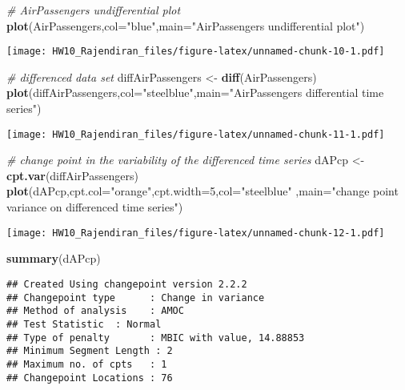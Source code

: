 \documentclass[]{article}
\newenvironment{Shaded}{\begin{snugshade}}{\end{snugshade}}
\newcommand{\CommentTok}[1]{\textcolor[rgb]{0.56,0.35,0.01}{\textit{#1}}}
\newcommand{\DataTypeTok}[1]{\textcolor[rgb]{0.13,0.29,0.53}{#1}}
\newcommand{\DecValTok}[1]{\textcolor[rgb]{0.00,0.00,0.81}{#1}}
\newcommand{\KeywordTok}[1]{\textcolor[rgb]{0.13,0.29,0.53}{\textbf{#1}}}
\newcommand{\NormalTok}[1]{#1}
\newcommand{\StringTok}[1]{\textcolor[rgb]{0.31,0.60,0.02}{#1}}
\begin{document}
\begin{Shaded}
\begin{Highlighting}[]
\CommentTok{# AirPassengers undifferential plot}
\KeywordTok{plot}\NormalTok{(AirPassengers,}\DataTypeTok{col=}\StringTok{"blue"}\NormalTok{,}\DataTypeTok{main=}\StringTok{"AirPassengers undifferential plot"}\NormalTok{)}
\end{Highlighting}
\end{Shaded}

\texttt{[image: HW10\_Rajendiran\_files/figure-latex/unnamed-chunk-10-1.pdf]}

\begin{Shaded}
\begin{Highlighting}[]
\CommentTok{# differenced data set}
\NormalTok{diffAirPassengers <-}\StringTok{ }\KeywordTok{diff}\NormalTok{(AirPassengers)}
\KeywordTok{plot}\NormalTok{(diffAirPassengers,}\DataTypeTok{col=}\StringTok{"steelblue"}\NormalTok{,}\DataTypeTok{main=}\StringTok{"AirPassengers differential time series"}\NormalTok{)}
\end{Highlighting}
\end{Shaded}

\texttt{[image: HW10\_Rajendiran\_files/figure-latex/unnamed-chunk-11-1.pdf]}

\begin{Shaded}
\begin{Highlighting}[]
\CommentTok{# change point in the variability of the differenced time series}
\NormalTok{dAPcp <-}\StringTok{ }\KeywordTok{cpt.var}\NormalTok{(diffAirPassengers)}
\KeywordTok{plot}\NormalTok{(dAPcp,}\DataTypeTok{cpt.col=}\StringTok{"orange"}\NormalTok{,}\DataTypeTok{cpt.width=}\DecValTok{5}\NormalTok{,}\DataTypeTok{col=}\StringTok{"steelblue"}
\NormalTok{     ,}\DataTypeTok{main=}\StringTok{"change point variance on differenced time series"}\NormalTok{)}
\end{Highlighting}
\end{Shaded}

\texttt{[image: HW10\_Rajendiran\_files/figure-latex/unnamed-chunk-12-1.pdf]}

\begin{Shaded}
\begin{Highlighting}[]
\KeywordTok{summary}\NormalTok{(dAPcp)}
\end{Highlighting}
\end{Shaded}

\begin{verbatim}
## Created Using changepoint version 2.2.2 
## Changepoint type      : Change in variance 
## Method of analysis    : AMOC 
## Test Statistic  : Normal 
## Type of penalty       : MBIC with value, 14.88853 
## Minimum Segment Length : 2 
## Maximum no. of cpts   : 1 
## Changepoint Locations : 76
\end{verbatim}
\end{document}

